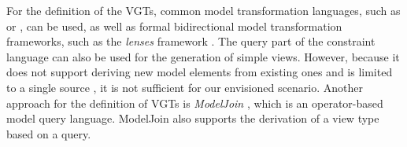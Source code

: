 For the definition of the VGTs, common model transformation languages, such as \cite{omg_qvt} or \cite{eclipse_atl}, can be used, as well as formal bidirectional model transformation frameworks, such as the \emph{lenses} framework \autocite{foster_combinators_2007}.
The query part of the constraint language \cite{omg_ocl} can also be used for the generation of simple views.
However, because it does not support deriving new model elements from existing ones and is limited to a single source \metamodel, it is not sufficient for our envisioned scenario.
Another approach for the definition of VGTs is \emph{ModelJoin} \autocite{burger_model-join_2016}, which is an operator-based model query language.
ModelJoin also supports the derivation of a view type based on a query.

